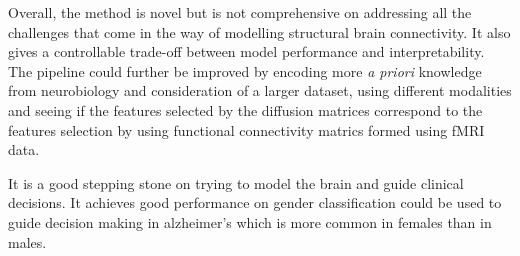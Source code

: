 \documentclass[msthesis.tex]{subfiles}
\begin{document}
Overall, the method is novel but is not comprehensive on addressing all the challenges that come in the way of modelling structural brain connectivity. It also gives a controllable trade-off between model performance and interpretability. The pipeline could further be improved by encoding more \textit{a priori} knowledge from neurobiology and consideration of a larger dataset, using different modalities and seeing if the features selected by the diffusion matrices correspond to the features selection by using functional connectivity matrics formed using fMRI data.

It is a good stepping stone on trying to model the brain and guide clinical decisions. It achieves good performance on gender classification could be used to guide decision making in alzheimer's which is more common in females than in males.
\end{document}
